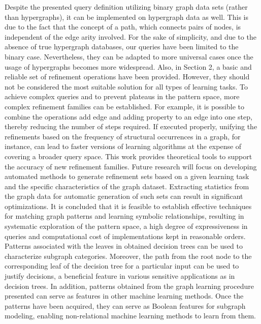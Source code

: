 \documentclass{article}%
\begin{document}
\newline%
Despite the presented query definition utilizing binary graph data sets (rather than hypergraphs), it can be implemented on hypergraph data as well. This is due to the fact that the concept of a path, which connects pairs of nodes, is independent of the edge arity involved. For the sake of simplicity, and due to the absence of true hypergraph databases, our queries have been limited to the binary case. Nevertheless, they can be adapted to more universal cases once the usage of hypergraphs becomes more widespread.\newline%
\newline%
Also, in Section 2, a basic and reliable set of refinement operations have been provided. However, they should not be considered the most suitable solution for all types of learning tasks. To achieve complex queries and to prevent plateaus in the pattern space, more complex refinement families can be established. For example, it is possible to combine the operations add edge and adding property to an edge into one step, thereby reducing the number of steps required. If executed properly, unifying the refinements based on the frequency of structural occurrences in a graph, for instance, can lead to faster versions of learning algorithms at the expense of covering a broader query space. This work provides theoretical tools to support the accuracy of new refinement families. Future research will focus on developing automated methods to generate refinement sets based on a given learning task and the specific characteristics of the graph dataset. Extracting statistics from the graph data for automatic generation of such sets can result in significant optimizations.\newline%
\newline%
It is concluded that it is feasible to establish effective techniques for matching graph patterns and learning symbolic relationships, resulting in systematic exploration of the pattern space, a high degree of expressiveness in queries and computational cost of implementations kept in reasonable orders.\newline%
\newline%
Patterns associated with the leaves in obtained decision trees can be used to characterize subgraph categories. Moreover, the path from the root node to the corresponding leaf of the decision tree for a particular input can be used to justify decisions, a beneficial feature in various sensitive applications as in decision trees. In addition, patterns obtained from the graph learning procedure presented can serve as features in other machine learning methods. Once the patterns have been acquired, they can serve as Boolean features for subgraph modeling, enabling non{-}relational machine learning methods to learn from them.\newline%
\end{document}
